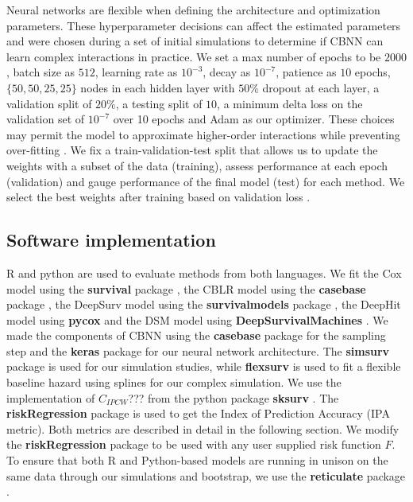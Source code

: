 \documentclass[AMA,STIX1COL,]{WileyNJD-v2}
\begin{document}
Neural networks are flexible when defining the architecture and
optimization parameters. These hyperparameter decisions can affect the
estimated parameters and were chosen during a set of initial simulations
to determine if CBNN can learn complex interactions in practice. We set
a max number of epochs to be \(2000\), batch size as \(512\), learning
rate as \(10^{-3}\), decay as \(10^{-7}\), patience as \(10\) epochs,
\(\{50,50,25,25\}\) nodes in each hidden layer with \(50\%\) dropout at
each layer, a validation split of \(20\%\), a testing split of \(10%
\), a minimum delta loss on the validation set of \(10^{-7}\) over 10
epochs and Adam \citep{gulli2017} as our optimizer. These choices may
permit the model to approximate higher-order interactions while
preventing over-fitting \citep{srivastava2014dropout}. We fix a
train-validation-test split that allows us to update the weights with a
subset of the data (training), assess performance at each epoch
(validation) and gauge performance of the final model (test) for each
method. We select the best weights after training based on validation
loss \citep{gulli2017}.

\hypertarget{software-implementation}{%
\subsection{Software implementation}\label{software-implementation}}

R \citep{Rsoft} and python \citep{py} are used to evaluate methods from
both languages. We fit the Cox model using the \textbf{survival} package
\citep{survpkg}, the CBLR model using the \textbf{casebase} package
\citep{cbpkg}, the DeepSurv model using the \textbf{survivalmodels}
package \citep{survmods}, the DeepHit model using \textbf{pycox}
\citep{lee2018DeepHit} and the DSM model using
\textbf{DeepSurvivalMachines} \citep{dsmPaper}. We made the components
of CBNN using the \textbf{casebase} package for the sampling step and
the \textbf{keras} \citep{keras} package for our neural network
architecture. The \textbf{simsurv} package \citep{simsurv} is used for
our simulation studies, while \textbf{flexsurv} \citep{flexsurv} is used
to fit a flexible baseline hazard using splines for our complex
simulation. We use the implementation of \(C_{IPCW}\)??? from the python
package \textbf{sksurv} \citep{sksurv}. The \textbf{riskRegression}
package \citep{riskRegression} is used to get the Index of Prediction
Accuracy (IPA metric). Both metrics are described in detail in the
following section. We modify the \textbf{riskRegression} package to be
used with any user supplied risk function \(F\). To ensure that both R
and Python-based models are running in unison on the same data through
our simulations and bootstrap, we use the \textbf{reticulate} package
\citep{reticulate}.
\end{document}
